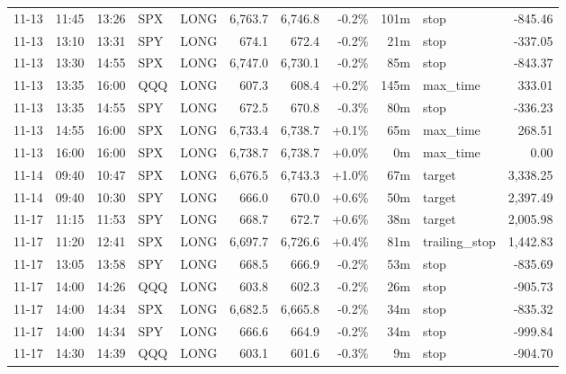 \documentclass[11pt,a4paper,twoside]{article}
\begin{document}
\begin{center}
\begin{longtable}{>{\color{txtmain}}l l l l l r r r r >{\color{txtmain}}l r}
11-13 & 11:45 & 13:26 & SPX & LONG & 6,763.7 & 6,746.8 & \textcolor{lossred}{-0.2\%} & 101m & stop & \textcolor{lossred}{-845.46} \\
11-13 & 13:10 & 13:31 & SPY & LONG & 674.1 & 672.4 & \textcolor{lossred}{-0.2\%} & 21m & stop & \textcolor{lossred}{-337.05} \\
11-13 & 13:30 & 14:55 & SPX & LONG & 6,747.0 & 6,730.1 & \textcolor{lossred}{-0.2\%} & 85m & stop & \textcolor{lossred}{-843.37} \\
11-13 & 13:35 & 16:00 & QQQ & LONG & 607.3 & 608.4 & \textcolor{wingreen}{+0.2\%} & 145m & max\_time & \textcolor{wingreen}{333.01} \\
11-13 & 13:35 & 14:55 & SPY & LONG & 672.5 & 670.8 & \textcolor{lossred}{-0.3\%} & 80m & stop & \textcolor{lossred}{-336.23} \\
11-13 & 14:55 & 16:00 & SPX & LONG & 6,733.4 & 6,738.7 & \textcolor{wingreen}{+0.1\%} & 65m & max\_time & \textcolor{wingreen}{268.51} \\
11-13 & 16:00 & 16:00 & SPX & LONG & 6,738.7 & 6,738.7 & \textcolor{wingreen}{+0.0\%} & 0m & max\_time & \textcolor{wingreen}{0.00} \\
11-14 & 09:40 & 10:47 & SPX & LONG & 6,676.5 & 6,743.3 & \textcolor{wingreen}{+1.0\%} & 67m & target & \textcolor{wingreen}{3,338.25} \\
11-14 & 09:40 & 10:30 & SPY & LONG & 666.0 & 670.0 & \textcolor{wingreen}{+0.6\%} & 50m & target & \textcolor{wingreen}{2,397.49} \\
11-17 & 11:15 & 11:53 & SPY & LONG & 668.7 & 672.7 & \textcolor{wingreen}{+0.6\%} & 38m & target & \textcolor{wingreen}{2,005.98} \\
11-17 & 11:20 & 12:41 & SPX & LONG & 6,697.7 & 6,726.6 & \textcolor{wingreen}{+0.4\%} & 81m & trailing\_stop & \textcolor{wingreen}{1,442.83} \\
11-17 & 13:05 & 13:58 & SPY & LONG & 668.5 & 666.9 & \textcolor{lossred}{-0.2\%} & 53m & stop & \textcolor{lossred}{-835.69} \\
11-17 & 14:00 & 14:26 & QQQ & LONG & 603.8 & 602.3 & \textcolor{lossred}{-0.2\%} & 26m & stop & \textcolor{lossred}{-905.73} \\
11-17 & 14:00 & 14:34 & SPX & LONG & 6,682.5 & 6,665.8 & \textcolor{lossred}{-0.2\%} & 34m & stop & \textcolor{lossred}{-835.32} \\
11-17 & 14:00 & 14:34 & SPY & LONG & 666.6 & 664.9 & \textcolor{lossred}{-0.2\%} & 34m & stop & \textcolor{lossred}{-999.84} \\
11-17 & 14:30 & 14:39 & QQQ & LONG & 603.1 & 601.6 & \textcolor{lossred}{-0.3\%} & 9m & stop & \textcolor{lossred}{-904.70} \\

\end{longtable}
\end{center}
\end{document}
